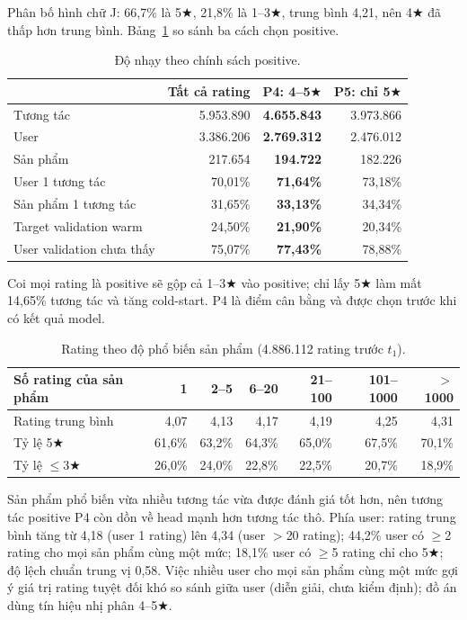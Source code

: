\documentclass[11pt,a4paper,oneside]{report}
\newcommand{\rstar}{\ensuremath{\bigstar}}
\begin{document}
Phân bố hình chữ J: 66,7\% là 5\rstar{}, 21,8\% là 1--3\rstar{}, trung bình 4,21, nên 4\rstar{} đã thấp hơn trung bình. Bảng~\ref{tab:policy} so sánh ba cách chọn positive.

\begin{table}[h]
\centering\small
\caption{Độ nhạy theo chính sách positive.}\label{tab:policy}
\begin{tabular}{lrrr}
\toprule
 & Tất cả rating & \textbf{P4: 4--5\rstar{}} & P5: chỉ 5\rstar{} \\
\midrule
Tương tác & 5.953.890 & \textbf{4.655.843} & 3.973.866 \\
User & 3.386.206 & \textbf{2.769.312} & 2.476.012 \\
Sản phẩm & 217.654 & \textbf{194.722} & 182.226 \\
User 1 tương tác & 70,01\% & \textbf{71,64\%} & 73,18\% \\
Sản phẩm 1 tương tác & 31,65\% & \textbf{33,13\%} & 34,34\% \\
Target validation warm & 24,50\% & \textbf{21,90\%} & 20,34\% \\
User validation chưa thấy & 75,07\% & \textbf{77,43\%} & 78,88\% \\
\bottomrule
\end{tabular}
\end{table}

Coi mọi rating là positive sẽ gộp cả 1--3\rstar{} vào positive; chỉ lấy 5\rstar{} làm mất 14,65\% tương tác và tăng cold-start. P4 là điểm cân bằng và được chọn trước khi có kết quả model.

\begin{table}[h]
\centering\small
\caption{Rating theo độ phổ biến sản phẩm (4.886.112 rating trước $t_1$).}\label{tab:ratingpop}
\begin{tabular}{lrrrrrr}
\toprule
Số rating của sản phẩm & 1 & 2--5 & 6--20 & 21--100 & 101--1000 & $>$1000 \\
\midrule
Rating trung bình & 4,07 & 4,13 & 4,17 & 4,19 & 4,25 & 4,31 \\
Tỷ lệ 5\rstar{} & 61,6\% & 63,2\% & 64,3\% & 65,0\% & 67,5\% & 70,1\% \\
Tỷ lệ $\le$3\rstar{} & 26,0\% & 24,0\% & 22,8\% & 22,5\% & 20,7\% & 18,9\% \\
\bottomrule
\end{tabular}
\end{table}
Sản phẩm phổ biến vừa nhiều tương tác vừa được đánh giá tốt hơn, nên tương tác positive P4 còn dồn về head mạnh hơn tương tác thô. Phía user: rating trung bình tăng từ 4,18 (user 1 rating) lên 4,34 (user $>$20 rating); 44,2\% user có $\ge$2 rating cho mọi sản phẩm cùng một mức; 18,1\% user có $\ge$5 rating chỉ cho 5\rstar{}; độ lệch chuẩn trung vị 0,58. Việc nhiều user cho mọi sản phẩm cùng một mức gợi ý giá trị rating tuyệt đối khó so sánh giữa user (diễn giải, chưa kiểm định); đồ án dùng tín hiệu nhị phân 4--5\rstar{}.
\end{document}

